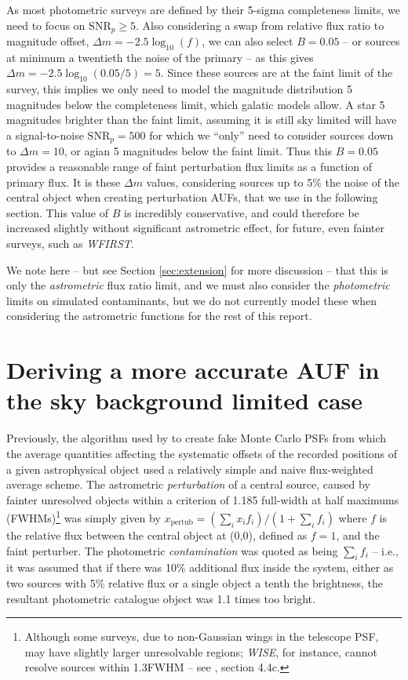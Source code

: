 \documentclass[fleqn,usenatbib]{mnras}
\begin{document}
As most photometric surveys are defined by their 5-sigma completeness limits, we need to focus on $\mathrm{SNR}_p \geq 5$. Also considering a swap from relative flux ratio to magnitude offset, $\Delta m = -2.5 \log_{10}(f)$, we can also select $B=0.05$ -- or sources at minimum a twentieth the noise of the primary -- as this gives $\Delta m = -2.5 \log_{10}(0.05/5) = 5$. 
Since these sources are at the faint limit of the survey, this implies we only need to model the magnitude distribution 5 magnitudes below the completeness limit, which galatic models allow. 
A star 5 magnitudes brighter than the faint limit, assuming it is still sky limited will have a signal-to-noise
$\mathrm{SNR}_p = 500$  for which we ``only'' need to consider sources down to $\Delta m = 10$, or agian 5 magnitudes below the faint limit.  Thus this $B=0.05$ provides a reasonable range of faint perturbation flux limits as a function of primary flux. It is these $\Delta m$ values, considering sources up to 5\% the noise of the central object when creating perturbation AUFs, that we use in the following section. This value of $B$ is incredibly conservative, and could therefore be increased slightly without significant astrometric effect, for future, even fainter surveys, such as \textit{WFIRST}.

We note here -- but see Section \ref{sec:extension} for more discussion -- that this is only the \textit{astrometric} flux ratio limit, and we must also consider the \textit{photometric} limits on simulated contaminants, but we do not currently model these when considering the astrometric functions for the rest of this report.

\section{Deriving a more accurate AUF in the sky background limited case}
\label{sec:loglfit}
Previously, the algorithm used by \cite{2018MNRAS.481.2148W} to create fake Monte Carlo PSFs from which the average quantities affecting the systematic offsets of the recorded positions of a given astrophysical object used a relatively simple and naive flux-weighted average scheme. The astrometric \textit{perturbation} of a central source, caused by fainter unresolved objects within a \citet{1880MNRAS..40..254R} criterion of 1.185 full-width at half maximums (FWHMs)\footnote{Although some surveys, due to non-Gaussian wings in the telescope PSF, may have slightly larger unresolvable regions; \textit{WISE}, for instance, cannot resolve sources within 1.3FWHM -- see \citet{Cutri:2012aa}, section 4.4c.} was simply given by $x_\mathrm{pertub} = (\sum_i x_i f_i) / (1 + \sum_i f_i)$ where $f$ is the relative flux between the central object at (0,0), defined as $f=1$, and the faint perturber. The photometric \textit{contamination} was quoted as being $\sum_i f_i$ -- i.e., it was assumed that if there was 10\% additional flux inside the system, either as two sources with 5\% relative flux or a single object a tenth the brightness, the resultant photometric catalogue object was 1.1 times too bright.
\end{document}
